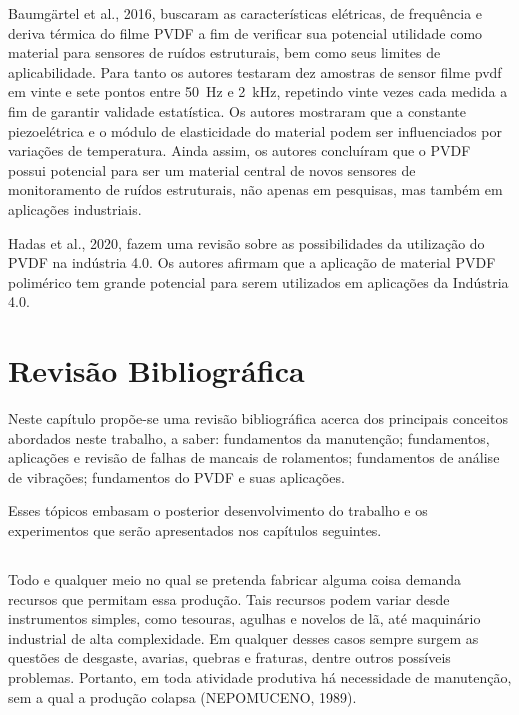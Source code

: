 \documentclass[
	12pt,				
	oneside,			
	a4paper,			
	english,			
	brazil,			
	]{abntex2ppgsi}
\begin{document}
Baumgärtel et al., 2016, buscaram as características elétricas, de frequência e deriva térmica do filme PVDF a fim de verificar sua potencial utilidade como material para sensores de ruídos estruturais, bem como seus limites de aplicabilidade. Para tanto os autores testaram dez amostras de sensor filme pvdf em vinte e sete pontos entre \SI{50}{\hertz} e \SI{2}{\kilo\hertz}, repetindo vinte vezes cada medida a fim de garantir validade estatística. Os autores mostraram que a constante piezoelétrica e o módulo de elasticidade do material podem ser influenciados por variações de temperatura. Ainda assim, os autores concluíram que o PVDF possui potencial para ser um material central de novos sensores de monitoramento de ruídos estruturais, não apenas em pesquisas, mas também em aplicações industriais.

Hadas et al., 2020, fazem uma revisão sobre as possibilidades da utilização do PVDF na indústria 4.0. Os autores afirmam que a aplicação de material PVDF polimérico tem grande potencial para serem utilizados em aplicações da Indústria 4.0. 


\chapter{Revisão Bibliográfica}

Neste capítulo propõe-se uma revisão bibliográfica acerca dos principais conceitos abordados neste trabalho, a saber: fundamentos da manutenção; fundamentos, aplicações e revisão de falhas de mancais de rolamentos; fundamentos de análise de vibrações; fundamentos do PVDF e suas aplicações. 

Esses tópicos embasam o posterior desenvolvimento do trabalho e os experimentos que serão apresentados nos capítulos seguintes.

\section{}
Todo e qualquer meio no qual se pretenda fabricar alguma coisa demanda recursos que permitam essa produção. Tais recursos podem variar desde instrumentos simples, como tesouras, agulhas e novelos de lã, até maquinário industrial de alta complexidade. Em qualquer desses casos sempre surgem as questões de desgaste, avarias, quebras e fraturas, dentre outros possíveis problemas. Portanto, em toda atividade produtiva  há necessidade de manutenção, sem a qual a produção colapsa (NEPOMUCENO, 1989).
\end{document}
